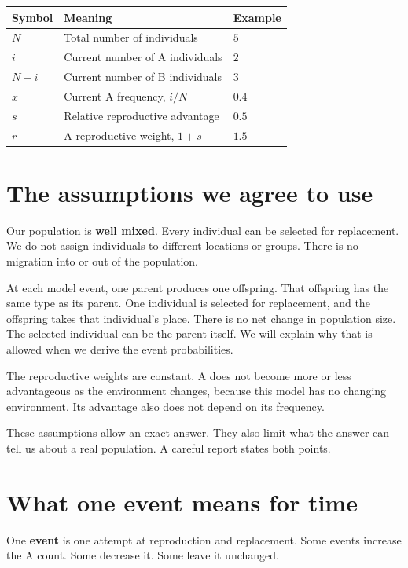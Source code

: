 \begin{center}
\begin{tabular}{lll}
\hline
Symbol & Meaning & Example \\
\hline
\(N\) & Total number of individuals & \(5\) \\
\(i\) & Current number of A individuals & \(2\) \\
\(N-i\) & Current number of B individuals & \(3\) \\
\(x\) & Current A frequency, \(i/N\) & \(0.4\) \\
\(s\) & Relative reproductive advantage & \(0.5\) \\
\(r\) & A reproductive weight, \(1+s\) & \(1.5\) \\
\hline
\end{tabular}
\end{center}

\section{The assumptions we agree to use}

Our population is \textbf{well mixed}. Every individual can be selected for
replacement. We do not assign individuals to different locations or groups.
There is no migration into or out of the population.

At each model event, one parent produces one offspring. That offspring has
the same type as its parent. One individual is selected for replacement,
and the offspring takes that individual's place. There is no net change in
population size. The selected individual can be the parent itself. We will
explain why that is allowed when we derive the event probabilities.

The reproductive weights are constant. A does not become more or less
advantageous as the environment changes, because this model has no changing
environment. Its advantage also does not depend on its frequency.

These assumptions allow an exact answer. They also limit what the answer
can tell us about a real population. A careful report states both points.

\section{What one event means for time}

One \textbf{event} is one attempt at reproduction and replacement. Some events
increase the A count. Some decrease it. Some leave it unchanged.


